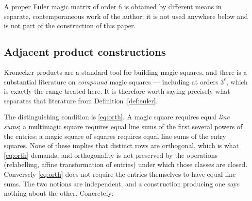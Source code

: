 \documentclass[11pt,a4paper]{amsart}
\theoremstyle{plain}
\theoremstyle{definition}
\theoremstyle{remark}
\begin{document}
A proper Euler magic matrix of order $6$ is obtained by different means in
separate, contemporaneous work of the author; it is not used anywhere below and
is not part of the construction of this paper.

\subsection*{Adjacent product constructions}\label{sec:adjacent}

Kronecker products are a standard tool for building magic squares, and there is
a substantial literature on \emph{compound} magic squares --- including at
orders $3^{\ell}$, which is exactly the range treated here. It is therefore
worth saying precisely what separates that literature from
Definition~\ref{def:euler}.

The distinguishing condition is \eqref{eq:orth}. A magic square requires equal
\emph{line sums}; a multimagic square requires equal line sums of the first
several powers of the entries; a magic square of squares requires equal line
sums of the entry squares. None of these implies that distinct rows are
orthogonal, which is what \eqref{eq:orth} demands, and orthogonality is not
preserved by the operations (relabelling, affine transformation of entries)
under which those classes are closed. Conversely \eqref{eq:orth} does not
require the entries themselves to have equal line sums. The two notions are
independent, and a construction producing one says nothing about the other.
Concretely:
\end{document}
